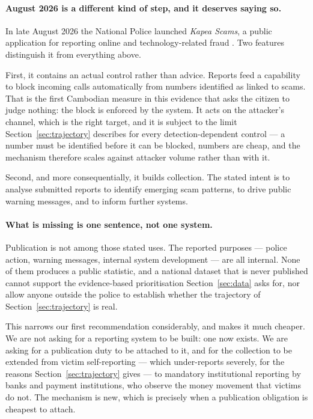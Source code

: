 \documentclass[10pt,a4paper,twocolumn]{article}
\begin{document}
\paragraph{August 2026 is a different kind of step, and it deserves saying so.}
In late August 2026 the National Police launched \emph{Kapea Scams}, a public
application for reporting online and technology-related fraud
\citep{khmertimes2026kapea}. Two features distinguish it from everything above.

First, it contains an actual control rather than advice. Reports feed a
capability to block incoming calls automatically from numbers identified as
linked to scams. That is the first Cambodian measure in this evidence that asks
the citizen to judge nothing: the block is enforced by the system. It acts on
the attacker's channel, which is the right target, and it is subject to the
limit Section~\ref{sec:trajectory} describes for every detection-dependent
control --- a number must be identified before it can be blocked, numbers are
cheap, and the mechanism therefore scales against attacker volume rather than
with it.

Second, and more consequentially, it builds collection. The stated intent is to
analyse submitted reports to identify emerging scam patterns, to drive public
warning messages, and to inform further systems.

\paragraph{What is missing is one sentence, not one system.}
Publication is not among those stated uses. The reported purposes --- police
action, warning messages, internal system development --- are all internal. None
of them produces a public statistic, and a national dataset that is never
published cannot support the evidence-based prioritisation
Section~\ref{sec:data} asks for, nor allow anyone outside the police to
establish whether the trajectory of
Section~\ref{sec:trajectory} is real.

This narrows our first recommendation considerably, and makes it much cheaper.
We are not asking for a reporting system to be built: one now exists. We are
asking for a publication duty to be attached to it, and for the collection to
be extended from victim self-reporting --- which under-reports severely, for the
reasons Section~\ref{sec:trajectory} gives --- to mandatory institutional
reporting by banks and payment institutions, who observe the money movement that
victims do not. The mechanism is new, which is precisely when a publication
obligation is cheapest to attach.
\end{document}
